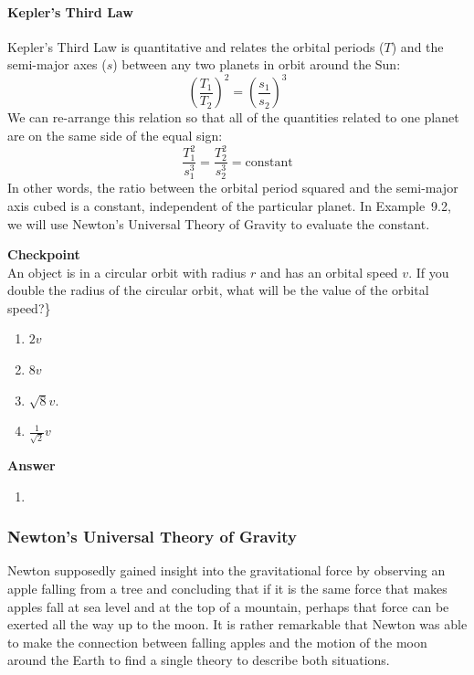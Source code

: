 \paragraph{Kepler's Third Law}

Kepler's Third Law is quantitative and relates the orbital periods ($T$) and the semi-major axes ($s$) between any two planets in orbit around the Sun:
\begin{equation}
\left(\frac{T_1}{T_2}\right)^2=\left(\frac{s_1}{s_2}\right)^3
\end{equation}
We can re-arrange this relation so that all of the quantities related to one planet are on the same side of the equal sign:
\begin{equation}
\frac{T_1^2}{s_1^3}=\frac{T_2^2}{s_2^3}=\text{constant}
\end{equation}
In other words, the ratio between the orbital period squared and the semi-major axis cubed is a constant, independent of the particular planet. In Example~9.2, we will use Newton's Universal Theory of Gravity to evaluate the constant.

\begin{framed}
\textbf{Checkpoint}\\
An object is in a circular orbit with radius $r$ and has an orbital speed $v$. If you double the radius of the circular orbit, what will be the value of the orbital speed?\}

\begin{enumerate}
\item $2v$
\item $8v$
\item $\sqrt{8}v$.
\item $\frac{1}{\sqrt{2}}v$
\end{enumerate}

\begin{framed}
\textbf{Answer}\\
\begin{enumerate}[resume]
\item
\end{enumerate}
\end{framed}
\end{framed}

\subsubsection{Newton's Universal Theory of Gravity}

Newton supposedly gained insight into the gravitational force by observing an apple falling from a tree and concluding that if it is the same force that makes apples fall at sea level and at the top of a mountain, perhaps that force can be exerted all the way up to the moon. It is rather remarkable that Newton was able to make the connection between falling apples and the motion of the moon around the Earth to find a single theory to describe both situations.

